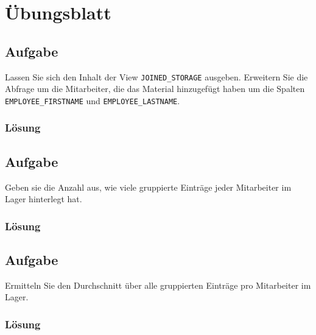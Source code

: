 \section{Übungsblatt}
\label{sec:uebung_04}

\subsection{Aufgabe}
\label{sec:uebung_04.aufgabe_01}
Lassen Sie sich den Inhalt der View \texttt{JOINED\_STORAGE} ausgeben. Erweitern Sie die Abfrage um die Mitarbeiter, die das Material hinzugefügt haben um die Spalten \texttt{EMPLOYEE\_FIRSTNAME} und \texttt{EMPLOYEE\_LASTNAME}.

\subsubsection*{Lösung}
\label{sec:uebung_04.aufgabe_01.loesung}

\subsection{Aufgabe}
\label{sec:uebung_04.aufgabe_02}
Geben sie die Anzahl aus, wie viele gruppierte Einträge jeder Mitarbeiter im Lager hinterlegt hat.

\subsubsection*{Lösung}
\label{sec:uebung_04.aufgabe_02.loesung}

\subsection{Aufgabe}
\label{sec:uebung_04.aufgabe_03}
Ermitteln Sie den Durchschnitt über alle gruppierten Einträge pro Mitarbeiter im Lager.

\subsubsection*{Lösung}
\label{sec:uebung_04.aufgabe_03.loesung}

